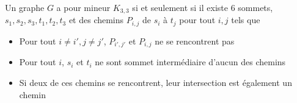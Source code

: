 \documentclass{scrartcl}
\begin{document}
\begin{flushleft}
\begin{lem*}[\ref{CNSK33}]
    Un graphe $G$ a pour mineur $K_{3,3}$ si et seulement si il existe $6$ sommets, $s_1, s_2, s_3, t_1, t_2, t_3$ et des chemins
    $P_{i,j}$ de $s_i$ à $t_j$ pour tout $i, j$ tels que
    \begin{itemize}
        \item Pour tout $i \neq i', j \neq j'$, $P_{i',j'}$ et $P_{i, j}$ ne se rencontrent pas
        \item Pour tout $i$, $s_i$ et $t_i$ ne sont sommet intermédiaire d'aucun des chemins
        \item Si deux de ces chemins se rencontrent, leur intersection est également un chemin
    \end{itemize}
\end{lem*}


\end{flushleft}
\end{document}
